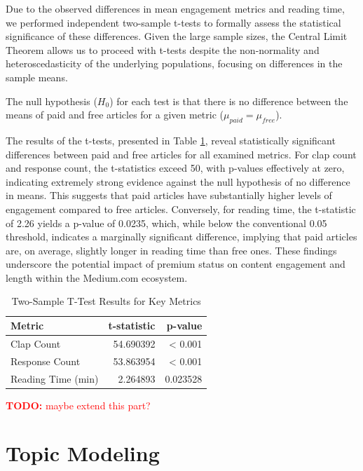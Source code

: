 \documentclass[11pt,a4paper]{article}
\newcommand{\todo}[1]{\textcolor{red}{\textbf{TODO:} #1}}
\begin{document}
Due to the observed differences in mean engagement metrics and reading time, we performed independent two-sample t-tests to formally assess the statistical significance of these differences. Given the large sample sizes, the Central Limit Theorem allows us to proceed with t-tests despite the non-normality and heteroscedasticity of the underlying populations, focusing on differences in the sample means.

The null hypothesis ($H_0$) for each test is that there is no difference between the means of paid and free articles for a given metric ($\mu_{paid} = \mu_{free}$).

The results of the t-tests, presented in Table \ref{tab:t_test_results}, reveal statistically significant differences between paid and free articles for all examined metrics. For clap count and response count, the t-statistics exceed 50, with p-values effectively at zero, indicating extremely strong evidence against the null hypothesis of no difference in means. This suggests that paid articles have substantially higher levels of engagement compared to free articles. Conversely, for reading time, the t-statistic of 2.26 yields a p-value of 0.0235, which, while below the conventional 0.05 threshold, indicates a marginally significant difference, implying that paid articles are, on average, slightly longer in reading time than free ones. These findings underscore the potential impact of premium status on content engagement and length within the Medium.com ecosystem.

\begin{table}[H]
    \centering
    \caption{Two-Sample T-Test Results for Key Metrics}
    \label{tab:t_test_results}
    \begin{tabular}{lrr}
        \toprule
        \textbf{Metric} & \textbf{t-statistic} & \textbf{p-value} \\
        \midrule
        Clap Count & 54.690392 & < 0.001 \\
        Response Count & 53.863954 & < 0.001 \\
        Reading Time (min) & 2.264893 & 0.023528 \\
        \bottomrule
    \end{tabular}
\end{table}

\todo{maybe extend this part?}

\section{Topic Modeling}
\end{document}
